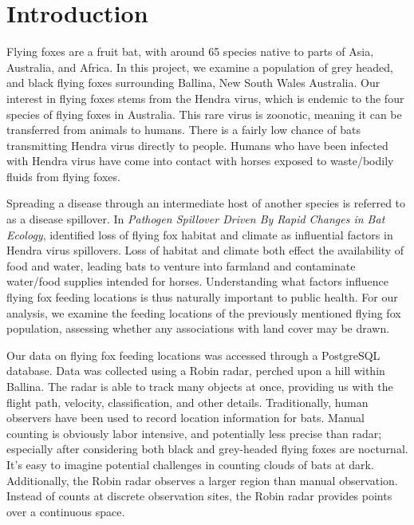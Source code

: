 \documentclass[
  12pt,
  letterpaper,
  DIV=11,
  numbers=noendperiod]{scrartcl}
\renewcommand*\contentsname{Table of contents}
\newcommand\contentsname{Table of contents}
\begin{document}
\vspace{2.in}
\begin{abstract}

\end{abstract}


\newpage


\renewcommand*\contentsname{Table of contents}
{
\hypersetup{linkcolor=}
\setcounter{tocdepth}{3}
\tableofcontents
}

\newpage

\section{Introduction}\label{sec:intro}

Flying foxes are a fruit bat, with around 65 species native to parts of
Asia, Australia, and Africa. In this project, we examine a population of
grey headed, and black flying foxes surrounding Ballina, New South Wales
Australia. Our interest in flying foxes stems from the Hendra virus,
which is endemic to the four species of flying foxes in Australia. This
rare virus is zoonotic, meaning it can be transferred from animals to
humans. There is a fairly low chance of bats transmitting Hendra virus
directly to people. Humans who have been infected with Hendra virus have
come into contact with horses exposed to waste/bodily fluids from flying
foxes.

Spreading a disease through an intermediate host of another species is
referred to as a disease spillover. In \emph{Pathogen Spillover Driven
By Rapid Changes in Bat Ecology}, \cite{andy_art} identified loss of
flying fox habitat and climate as influential factors in Hendra virus
spillovers. Loss of habitat and climate both effect the availability of
food and water, leading bats to venture into farmland and contaminate
water/food supplies intended for horses. Understanding what factors
influence flying fox feeding locations is thus naturally important to
public health. For our analysis, we examine the feeding locations of the
previously mentioned flying fox population, assessing whether any
associations with land cover may be drawn.

Our data on flying fox feeding locations was accessed through a
PostgreSQL database. Data was collected using a Robin radar, perched
upon a hill within Ballina. The radar is able to track many objects at
once, providing us with the flight path, velocity, classification, and
other details. Traditionally, human observers have been used to record
location information for bats. Manual counting is obviously labor
intensive, and potentially less precise than radar; especially after
considering both black and grey-headed flying foxes are nocturnal. It's
easy to imagine potential challenges in counting clouds of bats at dark.
Additionally, the Robin radar observes a larger region than manual
observation. Instead of counts at discrete observation sites, the Robin
radar provides points over a continuous space.
\end{document}
